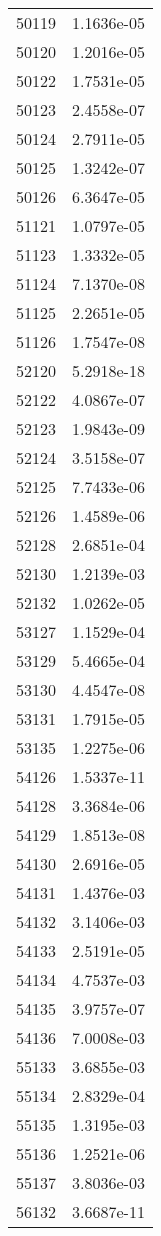 \begin{table}[h!]
\begin{tabular}{|| c || c |}
50119 & 1.1636e-05 \\
50120 & 1.2016e-05 \\
50122 & 1.7531e-05 \\
50123 & 2.4558e-07 \\
50124 & 2.7911e-05 \\
50125 & 1.3242e-07 \\
50126 & 6.3647e-05 \\
51121 & 1.0797e-05 \\
51123 & 1.3332e-05 \\
51124 & 7.1370e-08 \\
51125 & 2.2651e-05 \\
51126 & 1.7547e-08 \\
52120 & 5.2918e-18 \\
52122 & 4.0867e-07 \\
52123 & 1.9843e-09 \\
52124 & 3.5158e-07 \\
52125 & 7.7433e-06 \\
52126 & 1.4589e-06 \\
52128 & 2.6851e-04 \\
52130 & 1.2139e-03 \\
52132 & 1.0262e-05 \\
53127 & 1.1529e-04 \\
53129 & 5.4665e-04 \\
53130 & 4.4547e-08 \\
53131 & 1.7915e-05 \\
53135 & 1.2275e-06 \\
54126 & 1.5337e-11 \\
54128 & 3.3684e-06 \\
54129 & 1.8513e-08 \\
54130 & 2.6916e-05 \\
54131 & 1.4376e-03 \\
54132 & 3.1406e-03 \\
54133 & 2.5191e-05 \\
54134 & 4.7537e-03 \\
54135 & 3.9757e-07 \\
54136 & 7.0008e-03 \\
55133 & 3.6855e-03 \\
55134 & 2.8329e-04 \\
55135 & 1.3195e-03 \\
55136 & 1.2521e-06 \\
55137 & 3.8036e-03 \\
56132 & 3.6687e-11 \\

\end{tabular}
\end{table}
